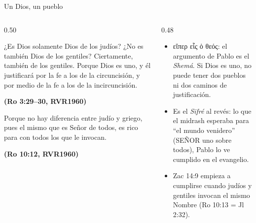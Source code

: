 \documentclass[hyperref={bookmarks=false},aspectratio=169]{beamer}
\newcommand{\grc}[1]{\foreignlanguage{ancientgreek}{#1}}
\newcommand{\SENOR}{S{\fontsize{0.78em}{1em}\selectfont EÑOR}}
\newcommand{\fuente}[1]{\par\hfill{\upshape\bfseries\footnotesize\textcolor{azul}{#1}}}
\begin{document}
\begin{frame}{Un Dios, un pueblo}
\begin{columns}[t,onlytextwidth]
\begin{column}{0.50\textwidth}
\begin{cita}[fontupper=\scriptsize\itshape]¿Es Dios solamente Dios de los judíos? ¿No es también Dios de los gentiles? Ciertamente, también de los gentiles. Porque Dios es uno, y él justificará por la fe a los de la circuncisión, y por medio de la fe a los de la incircuncisión.\fuente{(Ro 3:29--30, RVR1960)}\end{cita}
\begin{cita}[fontupper=\scriptsize\itshape]Porque no hay diferencia entre judío y griego, pues el mismo que es Señor de todos, es rico para con todos los que le invocan.\fuente{(Ro 10:12, RVR1960)}\end{cita}
\end{column}
\begin{column}{0.48\textwidth}\small
\begin{itemize}
\item \grc{εἴπερ εἷς ὁ θεός}: el argumento de Pablo es el \emph{Shemá}. Si Dios es uno, no puede tener dos pueblos ni dos caminos de justificación.
\item Es el \emph{Sifré} al revés: lo que el midrash esperaba para ``el mundo venidero'' (\SENOR{} uno sobre todos), Pablo lo ve cumplido en el evangelio.
\item Zac 14:9 empieza a cumplirse cuando judíos y gentiles invocan el mismo Nombre (Ro 10:13 = Jl 2:32).
\end{itemize}
\end{column}
\end{columns}
\end{frame}
\end{document}
